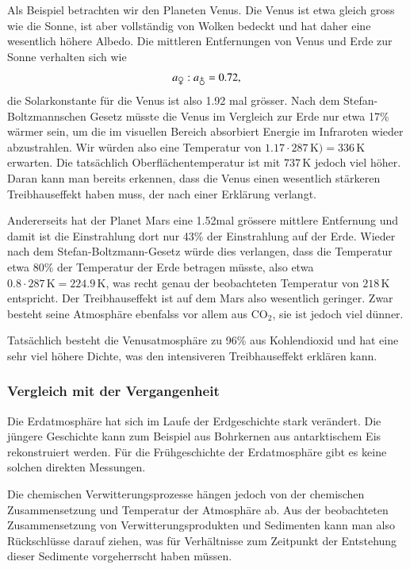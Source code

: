 Als Beispiel betrachten wir den Planeten Venus.
Die Venus ist etwa gleich gross wie die Sonne, ist aber vollständig
von Wolken bedeckt und hat daher eine wesentlich höhere Albedo.
Die mittleren Entfernungen von Venus und Erde zur Sonne verhalten
sich wie
\[
a_{\venus}
:
a_{\earth}
=
0.72,
\]
die Solarkonstante für die Venus ist also 1.92 mal grösser.
Nach dem Stefan-Boltzmannschen Gesetz müsste die Venus im Vergleich
zur Erde nur etwa 17\% wärmer sein, um die im visuellen Bereich
absorbiert Energie im Infraroten wieder abzustrahlen.
Wir würden also eine Temperatur von $1.17\cdot 287\,\text{K})=336\,\text{K}$
erwarten.
Die tatsächlich Oberflächentemperatur ist mit $737\,\text{K}$ jedoch viel
höher.
Daran kann man bereits erkennen, dass die Venus einen wesentlich
stärkeren Treibhauseffekt haben muss, der nach einer Erklärung
verlangt.

Andererseits hat der Planet Mars eine 1.52mal grössere mittlere
Entfernung und damit ist die Einstrahlung dort nur 43\% der
Einstrahlung auf der Erde.
Wieder nach dem Stefan-Boltzmann-Gesetz würde dies verlangen, dass die
Temperatur etwa 80\% der Temperatur der Erde betragen müsste,
also etwa $0.8\cdot 287\,\text{K} = 224.9\,\text{K}$, was recht genau
der beobachteten Temperatur von $218\,\text{K}$ entspricht.
Der Treibhauseffekt ist auf dem Mars also wesentlich geringer.
Zwar besteht seine Atmosphäre ebenfalss vor allem aus $\text{CO}_2$,
sie ist jedoch viel dünner.

Tatsächlich besteht die Venusatmosphäre zu 96\% aus Kohlendioxid und
hat eine sehr viel höhere Dichte, was den intensiveren Treibhauseffekt
erklären kann.

\subsubsection{Vergleich mit der Vergangenheit}
Die Erdatmosphäre hat sich im Laufe der Erdgeschichte stark verändert.
Die jüngere Geschichte kann zum Beispiel aus Bohrkernen aus antarktischem
Eis rekonstruiert werden.
Für die Frühgeschichte der Erdatmosphäre gibt es keine solchen direkten
Messungen.

Die chemischen Verwitterungsprozesse hängen jedoch von der chemischen
Zusammensetzung und Temperatur der Atmosphäre ab.
Aus der beobachteten Zusammensetzung von Verwitterungsprodukten und
Sedimenten kann man also Rückschlüsse darauf ziehen, was für Verhältnisse
zum Zeitpunkt der Entstehung dieser Sedimente vorgeherrscht haben müssen.

